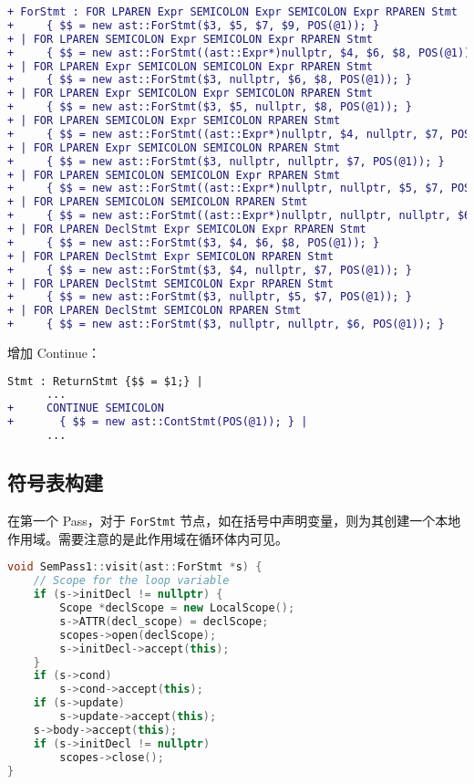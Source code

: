 \documentclass[a4paper]{article}
\begin{document}
\begin{lstlisting}[language=diff]
+ ForStmt : FOR LPAREN Expr SEMICOLON Expr SEMICOLON Expr RPAREN Stmt
+     { $$ = new ast::ForStmt($3, $5, $7, $9, POS(@1)); }
+ | FOR LPAREN SEMICOLON Expr SEMICOLON Expr RPAREN Stmt
+     { $$ = new ast::ForStmt((ast::Expr*)nullptr, $4, $6, $8, POS(@1)); }
+ | FOR LPAREN Expr SEMICOLON SEMICOLON Expr RPAREN Stmt
+     { $$ = new ast::ForStmt($3, nullptr, $6, $8, POS(@1)); }
+ | FOR LPAREN Expr SEMICOLON Expr SEMICOLON RPAREN Stmt
+     { $$ = new ast::ForStmt($3, $5, nullptr, $8, POS(@1)); }
+ | FOR LPAREN SEMICOLON Expr SEMICOLON RPAREN Stmt
+     { $$ = new ast::ForStmt((ast::Expr*)nullptr, $4, nullptr, $7, POS(@1)); }
+ | FOR LPAREN Expr SEMICOLON SEMICOLON RPAREN Stmt
+     { $$ = new ast::ForStmt($3, nullptr, nullptr, $7, POS(@1)); }
+ | FOR LPAREN SEMICOLON SEMICOLON Expr RPAREN Stmt
+     { $$ = new ast::ForStmt((ast::Expr*)nullptr, nullptr, $5, $7, POS(@1)); }
+ | FOR LPAREN SEMICOLON SEMICOLON RPAREN Stmt
+     { $$ = new ast::ForStmt((ast::Expr*)nullptr, nullptr, nullptr, $6, POS(@1)); }
+ | FOR LPAREN DeclStmt Expr SEMICOLON Expr RPAREN Stmt
+     { $$ = new ast::ForStmt($3, $4, $6, $8, POS(@1)); }
+ | FOR LPAREN DeclStmt Expr SEMICOLON RPAREN Stmt
+     { $$ = new ast::ForStmt($3, $4, nullptr, $7, POS(@1)); }
+ | FOR LPAREN DeclStmt SEMICOLON Expr RPAREN Stmt
+     { $$ = new ast::ForStmt($3, nullptr, $5, $7, POS(@1)); }
+ | FOR LPAREN DeclStmt SEMICOLON RPAREN Stmt
+     { $$ = new ast::ForStmt($3, nullptr, nullptr, $6, POS(@1)); }
\end{lstlisting}

增加 Continue：

\begin{lstlisting}[language=diff]
  Stmt : ReturnStmt {$$ = $1;} |
      ...
+     CONTINUE SEMICOLON
+       { $$ = new ast::ContStmt(POS(@1)); } |
      ...
\end{lstlisting}

\subsection{符号表构建}

在第一个 Pass，对于 \texttt{ForStmt} 节点，如在括号中声明变量，则为其创建一个本地作用域。需要注意的是此作用域在循环体内可见。

\begin{lstlisting}[language=c++]
void SemPass1::visit(ast::ForStmt *s) {
    // Scope for the loop variable
    if (s->initDecl != nullptr) {
        Scope *declScope = new LocalScope();
        s->ATTR(decl_scope) = declScope;
        scopes->open(declScope);
        s->initDecl->accept(this);
    }
    if (s->cond)
        s->cond->accept(this);
    if (s->update)
        s->update->accept(this);
    s->body->accept(this);
    if (s->initDecl != nullptr)
        scopes->close();
}
\end{lstlisting}
\end{document}
